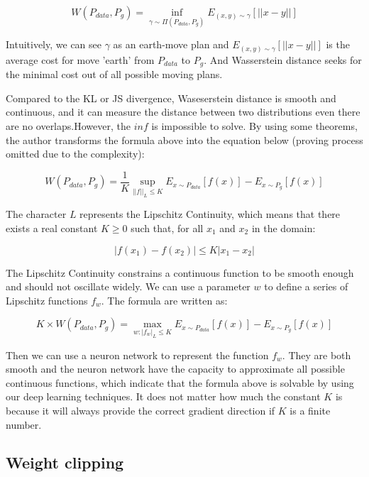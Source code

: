 \documentclass{article} %
\begin{document}
\begin{equation}
    W(P_{data},P_g)=\inf_{\gamma \sim \Pi(P_{data},P_g)}E_{(x,y) \sim \gamma}[||x-y||]
\end{equation}

Intuitively, we can see $\gamma$ as an earth-move plan and $E_{(x,y) \sim \gamma}[||x-y||]$ is the average cost for move 'earth' from $P_{data}$ to $P_g$. And Wasserstein distance seeks for the minimal cost out of all possible moving plans.

Compared to the KL or JS divergence, Waseserstein distance is smooth and continuous, and it can measure the distance between two distributions even there are no overlaps.However, the $inf$ is impossible to solve. By using some theorems, the author transforms the formula above into the equation below (proving process omitted due to the complexity):

\begin{equation}
    W(P_{data},P_g)=\frac{1}{K}\sup_{||f||_L\leq K}E_{x \sim P_{data}}[f(x)]-E_{x \sim P_g}[f(x)]
\end{equation}

The character $L$ represents the Lipschitz Continuity, which means that there exists a real constant $K \geq 0$ such that, for all $x_1$ and $x_2$ in the domain:

\begin{equation}
    |f(x_1)-f(x_2)| \leq K|x_1-x_2|
\end{equation}

The Lipschitz Continuity constrains a continuous function to be smooth enough and should not oscillate widely. We can use a parameter $w$ to define a series of Lipschitz functions $f_w$. The formula are written as:

\begin{equation}
    K \times W(P_{data},P_g)=\max_{w:|f_w|_L \leq K}E_{x \sim P_{data}}[f(x)]-E_{x \sim P_g}[f(x)]
\end{equation}

Then we can use a neuron network to represent the function $f_w$. They are both smooth and the neuron network have the capacity to approximate all possible continuous functions, which indicate that the formula above is solvable by using our deep learning techniques. It does not matter how much the constant $K$ is because it will always provide the correct gradient direction if $K$ is a finite number. 

\subsection{Weight clipping}
\end{document}

